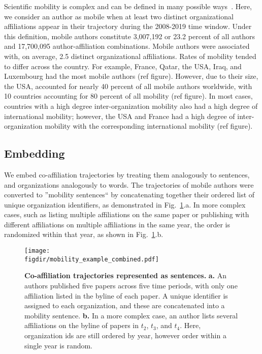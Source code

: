 \documentclass[12pt]{article} %
\def\figdir{../Figs}
\begin{document}
Scientific mobility is complex and can be defined in many possible ways~\autocite{robinson2019mobility}.
Here, we consider an author as mobile when at least two distinct organizational affiliations appear in their trajectory during the 2008-2019 time window.
Under this definition, mobile authors constitute 3,007,192 or 23.2 percent of all authors and 17,700,095 author-affiliation combinations.
Mobile authors were associated with, on average, 2.5 distinct organizational affiliations.
Rates of mobility tended to differ across the country.
For example, France, Qatar, the USA, Iraq, and Luxembourg had the most mobile authors (ref figure).
However, due to their size, the USA, accounted for nearly 40 percent of all mobile authors worldwide, with  10 countries accounting for 80 percent of all mobility (ref figure).
In most cases, countries with a high degree inter-organization mobility also had a high degree of international mobility;
however, the USA and France had a high degree of inter-organization mobility with the corresponding international mobility (ref figure).


\subsection*{Embedding}
We embed co-affiliation trajectories by treating them analogously to sentences, and organizations analogously to words.
The trajectories of mobile authors were converted to ''mobility sentences`` by concatenating together their ordered list of unique organization identifiers, as demonstrated in Fig.~\ref{fig:methods:mobility_sentence}.a.
In more complex cases, such as listing multiple affiliations on the same paper or publishing with different affiliations on multiple affiliations in the same year, the order is randomized within that year, as shown in  Fig.~\ref{fig:methods:mobility_sentence}.b.

%
%
\begin{figure}[ht!]
	\centering
	\texttt{[image: \\figdir/mobility\_example\_combined.pdf]}
	\caption{
		\textbf{Co-affiliation trajectories represented as sentences.}
		\textbf{a.}
		An authors published five papers across five time periods, with only one affiliation listed in the byline of each paper.
		A unique identifier is assigned to each organization, and these are concatenated into a mobility sentence.
		\textbf{b.}
		In a more complex case, an author lists several affiliations on the byline of papers in $t_{2}$, $t_{3}$, and $t_{4}$. Here, organization ids are still ordered by year, however order within a single year is random.
	}
	\label{fig:methods:mobility_sentence}
\end{figure}
\end{document}
